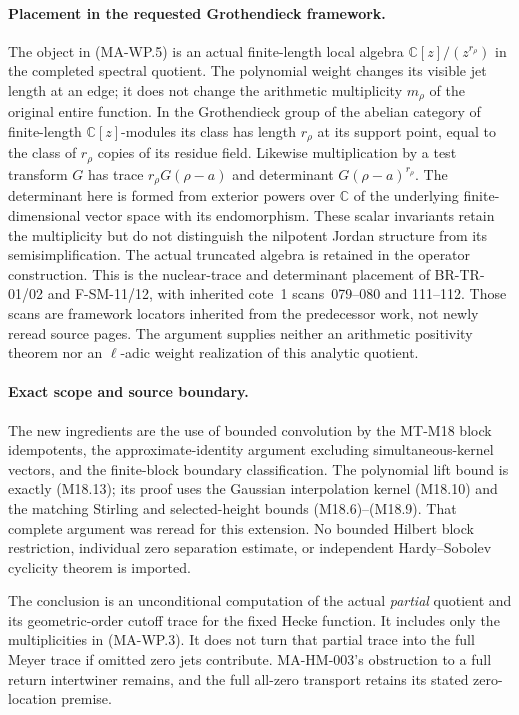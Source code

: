 \paragraph{Placement in the requested Grothendieck framework.}
The object in (MA-WP.5) is an actual finite-length local
algebra $\mathbb C[z]/(z^{r_\rho})$ in the completed
spectral quotient. The polynomial weight changes its
visible jet length at an edge; it does not change the
arithmetic multiplicity $m_\rho$ of the original entire
function. In the Grothendieck group of the abelian category
of finite-length $\mathbb C[z]$-modules its class has
length $r_\rho$ at its support point, equal to the
class of $r_\rho$ copies of its residue field. Likewise
multiplication by a test transform $G$ has trace
$r_\rho G(\rho-a)$ and determinant $G(\rho-a)^{r_\rho}$.
The determinant here is formed from exterior powers over
$\mathbb C$ of the underlying finite-dimensional vector
space with its endomorphism.
These scalar invariants retain the multiplicity but
do not distinguish the nilpotent Jordan structure
from its semisimplification. The actual truncated
algebra is retained in the operator construction.
This is the nuclear-trace and determinant placement
of BR-TR-01/02 and F-SM-11/12, with inherited cote~1
scans~079--080 and 111--112. Those scans are framework
locators inherited from the predecessor work, not
newly reread source pages. The argument supplies
neither an arithmetic positivity theorem nor an
$\ell$-adic weight realization of this analytic
quotient.

\paragraph{Exact scope and source boundary.}
The new ingredients are the use of bounded convolution
by the MT-M18 block idempotents, the approximate-identity
argument excluding simultaneous-kernel vectors, and the
finite-block boundary classification. The polynomial
lift bound is exactly (M18.13); its proof uses the
Gaussian interpolation kernel (M18.10) and the matching
Stirling and selected-height bounds (M18.6)--(M18.9).
That complete argument was reread for this extension.
No bounded Hilbert block restriction, individual zero
separation estimate, or independent Hardy--Sobolev
cyclicity theorem is imported.

The conclusion is an unconditional computation of the
actual \emph{partial} quotient and its geometric-order
cutoff trace for the fixed Hecke function. It includes
only the multiplicities in (MA-WP.3). It does not turn
that partial trace into the full Meyer trace if omitted
zero jets contribute. MA-HM-003's obstruction to a full
return intertwiner remains, and the full all-zero
transport retains its stated zero-location premise.
